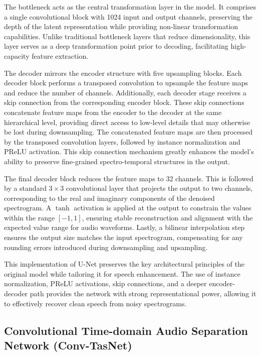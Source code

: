 The bottleneck acts as the central transformation layer in the model. It comprises a single convolutional block with 1024 input and output channels, preserving the depth of the latent representation while providing non-linear transformation capabilities. Unlike traditional bottleneck layers that reduce dimensionality, this layer serves as a deep transformation point prior to decoding, facilitating high-capacity feature extraction.

The decoder mirrors the encoder structure with five upsampling blocks. Each decoder block performs a transposed convolution to upsample the feature maps and reduce the number of channels. Additionally, each decoder stage receives a skip connection from the corresponding encoder block. These skip connections concatenate feature maps from the encoder to the decoder at the same hierarchical level, providing direct access to low-level details that may otherwise be lost during downsampling. The concatenated feature maps are then processed by the transposed convolution layers, followed by instance normalization and PReLU activation. This skip connection mechanism greatly enhances the model’s ability to preserve fine-grained spectro-temporal structures in the output.

The final decoder block reduces the feature maps to 32 channels. This is followed by a standard $3 \times 3$ convolutional layer that projects the output to two channels, corresponding to the real and imaginary components of the denoised spectrogram. A $\tanh$ activation is applied at the output to constrain the values within the range \([-1, 1]\), ensuring stable reconstruction and alignment with the expected value range for audio waveforms. Lastly, a bilinear interpolation step ensures the output size matches the input spectrogram, compensating for any rounding errors introduced during downsampling and upsampling.

This implementation of U-Net preserves the key architectural principles of the original model while tailoring it for speech enhancement. The use of instance normalization, PReLU activations, skip connections, and a deeper encoder-decoder path provides the network with strong representational power, allowing it to effectively recover clean speech from noisy spectrograms.

\subsection{Convolutional Time-domain Audio Separation Network (Conv-TasNet)}

